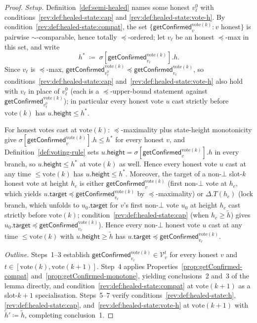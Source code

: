 \documentclass{article}
\newcommand{\V}[0]{\ensuremath{\mathcal{V}}}
\newcommand{\target}{\mathsf{target}}
\newcommand{\height}{\mathsf{height}}
\newcommand{\vote}{\ensuremath{\mathrm{vote}}}
\newcommand{\comm}[1]{\ensuremath{\widetilde{#1}}}
\newcommand{\getConfirmed}{\textsf{getConfirmed}\xspace}
\theoremstyle{plain}
\theoremstyle{definition}
\theoremstyle{remark}
\begin{document}
\begin{proof}

\emph{Setup.}
Definition~\ref{def:semi-healed} names some honest $v_\ell^0$ with conditions~\ref{rev:def:healed-state:cap} and \ref{rev:def:healed-state:vote-h}.
By condition~\ref{rev:def:healed-state:compat}, the set $\{\getConfirmed_v^{\vote(k)} : v \text{ honest}\}$ is pairwise $\sim$-comparable, hence totally $\preceq$-ordered;
let $v_\ell$ be an honest $\preceq$-max in this set, and write
\[
  h^\ast \;\coloneqq\; \sigma[\getConfirmed_{v_\ell}^{\vote(k)}].h.
\]
Since $v_\ell$ is $\preceq$-max, $\getConfirmed_{v_\ell^0}^{\vote(k)} \preceq \getConfirmed_{v_\ell}^{\vote(k)}$, so conditions~\ref{rev:def:healed-state:cap} and~\ref{rev:def:healed-state:vote-h} also hold with $v_\ell$ in place of $v_\ell^0$ (each is a $\preceq$-upper-bound statement against $\getConfirmed_{v_\ell^0}^{\vote(k)}$);
in particular every honest vote $u$ cast strictly before $\vote(k)$ has $u.\height \leq h^\ast$.

For honest votes cast at $\vote(k)$:
$\preceq$-maximality plus state-height monotonicity give $\sigma[\getConfirmed_v^{\vote(k)}].h \leq h^\ast$ for every honest $v$, and Definition~\ref{def:voting-rule} sets $u.\height = \sigma[\getConfirmed_v^{\vote(k)}].h$ in every branch, so $u.\height \leq h^\ast$ at $\vote(k)$ as well.
Hence every honest vote $u$ cast at any time $\leq \vote(k)$ has $u.\height \leq h^\ast$.
Moreover, the target of a non-$\bot$ slot-$k$ honest vote at height $h_c$ is either $\getConfirmed_v^{\vote(k)}$ (first non-$\bot$ vote at $h_c$, which yields $u.\target \preceq \getConfirmed_{v_\ell}^{\vote(k)}$ by $\preceq$-maximality) or $\Delta.T(h_c)$ (lock branch, which unfolds to $u_0.\target$ for $v$'s first non-$\bot$ vote $u_0$ at height $h_c$ cast strictly before $\vote(k)$; condition~\ref{rev:def:healed-state:cap} (when $h_c \geq \comm{h}$) gives $u_0.\target \preceq \getConfirmed_{v_\ell}^{\vote(k)}$).
Hence every non-$\bot$ honest vote $u$ cast at any time $\leq \vote(k)$ with $u.\height \geq \comm{h}$ has $u.\target \preceq \getConfirmed_{v_\ell}^{\vote(k)}$.

\emph{Outline.}
Steps~1--3 establish $\getConfirmed_{v_\ell}^{\vote(k)} \in \V_v^t$ for every honest $v$ and $t \in [\vote(k), \vote(k{+}1)]$.
Step~4 applies Properties~\ref{prop:getConfirmed-compat} and~\ref{prop:getConfirmed-monotone}, yielding conclusions~2 and~3 of the lemma directly, and condition~\ref{rev:def:healed-state:compat} at $\vote(k{+}1)$ as a slot-$k{+}1$ specialisation.
Steps~5--7 verify conditions~\ref{rev:def:healed-state:h}, \ref{rev:def:healed-state:cap}, and~\ref{rev:def:healed-state:vote-h} at $\vote(k{+}1)$ with $\comm{h}' \coloneqq \comm{h}$, completing conclusion~1.


\end{proof}
\end{document}
